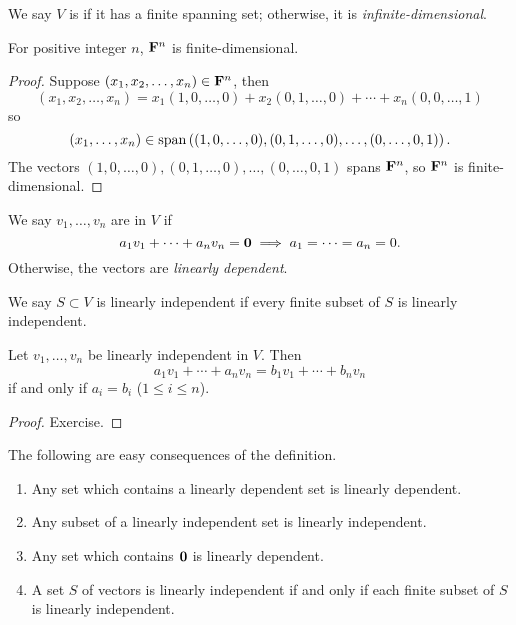 \begin{definition}
We say $V$ is  if it has a finite spanning set; otherwise, it is \emph{infinite-dimensional}.
\end{definition}

\begin{example}
For positive integer $n$, $\mathbf F^n$ is finite-dimensional.
\end{example}

\begin{proof}
Suppose $(x_1,x_2,\dots,x_n)\in\mathbf F^n$, then
\[(x_1,x_2,\dots,x_n)=x_1(1,0,\dots,0)+x_2(0,1,\dots,0)+\cdots+x_n(0,0,\dots,1)\]
so
\[(x_1,\dots,x_n)\in\operatorname{span}\left((1,0,\dots,0),(0,1,\dots,0),\dots,(0,\dots,0,1)\right).\]
The vectors $(1,0,\dots,0),(0,1,\dots,0),\dots,(0,\dots,0,1)$ spans $\mathbf F^n$, so $\mathbf F^n$ is finite-dimensional.
\end{proof}

\begin{definition}
We say $v_1,\dots,v_n$ are  in $V$ if
\[a_1v_1+\cdots+a_nv_n=\vb{0}\implies a_1=\cdots=a_n=0.\]
Otherwise, the vectors are \emph{linearly dependent}.

We say $S\subset V$ is linearly independent if every finite subset of $S$ is linearly independent.
\end{definition}

\begin{lemma}
Let $v_1,\dots,v_n$ be linearly independent in $V$. Then
\[a_1v_1+\cdots+a_nv_n=b_1v_1+\cdots+b_nv_n\]
if and only if $a_i=b_i$ ($1\le i\le n$).
\end{lemma}

\begin{proof}
Exercise.
\end{proof}

The following are easy consequences of the definition.
\begin{enumerate}
\item Any set which contains a linearly dependent set is linearly dependent.
\item Any subset of a linearly independent set is linearly independent.
\item Any set which contains $\vb{0}$ is linearly dependent.
\item A set $S$ of vectors is linearly independent if and only if each finite subset of $S$ is linearly independent.
\end{enumerate}

